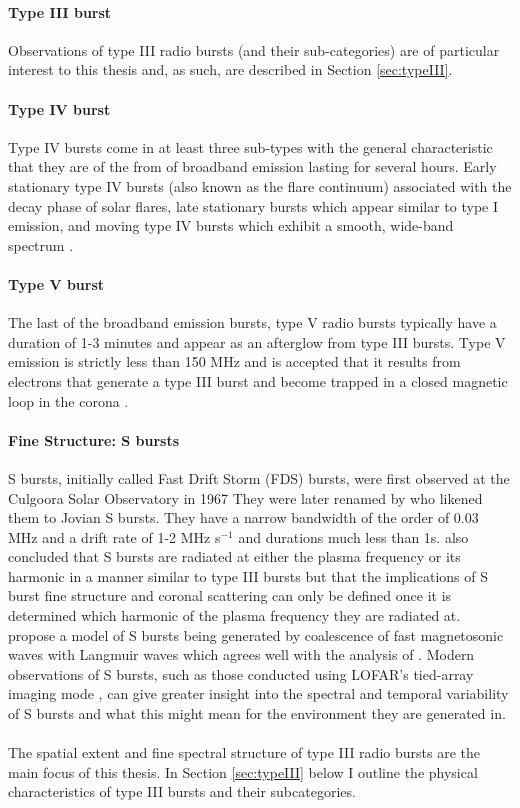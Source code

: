 \paragraph{Type III burst}
Observations of type III radio bursts (and their sub-categories) are of particular interest to this thesis and, as such, are described in Section \ref{sec:typeIII}.
\paragraph{Type IV burst}
Type IV bursts come in at least three sub-types with the general characteristic that they are of the from of broadband emission lasting for several hours. Early stationary type IV bursts (also known as the flare continuum) associated with the decay phase of solar flares, late stationary bursts which appear similar to type I emission, and moving type IV bursts which exhibit a smooth, wide-band spectrum \citep{McLean1985}.
\paragraph{Type V burst}
The last of the broadband emission bursts, type V radio bursts typically have a duration of 1-3 minutes and appear as an afterglow from type III bursts. Type V emission is strictly less than 150 MHz and is accepted that it results from electrons that generate a type III burst and become trapped in a closed magnetic loop in the corona \citep{McLean1985}.

\paragraph{Fine Structure: S bursts} 
S bursts, initially called Fast Drift Storm (FDS) bursts, were first observed at the Culgoora Solar Observatory in 1967 \citep{Ellis1969} They were later renamed by \cite{McConnell1980} who likened them to Jovian S bursts. They have a narrow bandwidth of the order of 0.03 MHz and a drift rate of 1-2 MHz s$^{-1}$ and durations much less than 1s. \cite{McConnell1980} also concluded that S bursts are radiated at either the plasma frequency or its harmonic in a manner similar to type III bursts but that the implications of S burst fine structure and coronal scattering can only be defined once it is determined which harmonic of the plasma frequency they are radiated at. \cite{Melnik2010} propose a model of S bursts being generated by coalescence of fast magnetosonic waves with Langmuir waves which agrees well with the analysis of \cite{Clarke2019}. Modern observations of S bursts, such as those conducted using LOFAR's tied-array imaging mode \citep{Morosan2015}, can give greater insight into the spectral and temporal variability of S bursts and what this might mean for the environment they are generated in.
\\
\\The spatial extent and fine spectral structure of type III radio bursts are the main focus of this thesis. In Section \ref{sec:typeIII} below I outline the physical characteristics of type III bursts and their subcategories.

